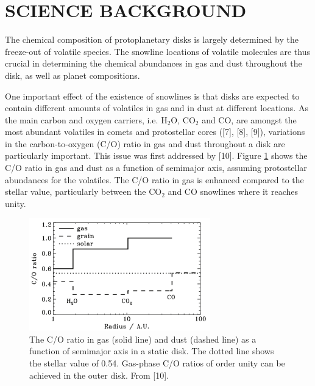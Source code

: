 \documentclass[12pt, letterpaper]{article}
\begin{document}
\section{SCIENCE BACKGROUND}


The chemical composition of protoplanetary disks is largely determined by the freeze-out of volatile species. The snowline locations of volatile molecules are thus crucial in determining the chemical abundances in gas and dust throughout the disk, as well as planet compositions. 

One important effect of the existence of snowlines is that disks are expected to contain different amounts of volatiles in gas and in dust at different locations. As the main carbon and oxygen carriers, i.e. H$_2$O, CO$_2$ and CO, are amongst the most abundant volatiles in comets and protostellar cores ([7], [8], [9]), variations in the carbon-to-oxygen (C/O) ratio in gas and dust throughout a disk are particularly important. This issue was first addressed by [10]. Figure \ref{fig:oberg} shows the C/O ratio in gas and dust as a function of semimajor axis, assuming protostellar abundances for the volatiles. The C/O ratio in gas is enhanced compared to the stellar value, particularly between the CO$_2$ and CO snowlines where it reaches unity. 

\begin{figure}[h!]
\centering
\includegraphics[width=0.7\textwidth]{oberg11.png}
\caption{The C/O ratio in gas (solid line) and dust (dashed line) as a function of semimajor axis in a static disk. The dotted line shows the stellar value of 0.54. Gas-phase C/O ratios of order unity can be achieved in the outer disk. From [10]. }
\label{fig:oberg}
\end{figure}
\end{document}
